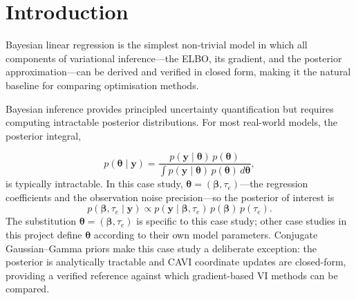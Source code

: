 \documentclass[11pt,a4paper]{article}
\begin{document}
\begin{abstract}
The comparison is not limited to ELBO convergence. The methods are also compared on runtime, iteration count, posterior mean accuracy, and posterior standard-deviation ratios against the analytical posterior and a Gibbs sampler reference. A secondary experiment adds entropy regularisation to the ELBO to test whether explicitly rewarding broader covariance estimates can reduce posterior variance collapse.

The central question is therefore not only which method maximises the ELBO. It is also whether the resulting approximation remains honest about uncertainty. This distinction is the main reason for using the linear model first: the posterior, CAVI baseline, and Gibbs reference can all be checked in the same setting before moving to less tractable models.
\end{abstract}

\newpage
\section{Introduction}

Bayesian linear regression is the simplest non-trivial model in which all components
of variational inference---the ELBO, its gradient, and the posterior approximation---can
be derived and verified in closed form, making it the natural baseline for comparing
optimisation methods.

Bayesian inference provides principled uncertainty quantification but requires computing intractable posterior distributions. For most real-world models, the posterior integral,

\begin{equation*}
    p(\bm{\theta} \mid \bm{y}) = \frac{p(\bm{y} \mid \bm{\theta})\,p(\bm{\theta})}{\displaystyle\int p(\bm{y} \mid \bm{\theta})\,p(\bm{\theta})\, d\bm{\theta}},
\end{equation*}
\noindent 
is typically intractable.
In this case study, $\bm{\theta} = (\bm{\beta}, \tau_e)$---the regression coefficients
and the observation noise precision---so the posterior of interest is
\begin{equation*}
    p(\bm{\beta}, \tau_e \mid \bm{y}) \propto p(\bm{y} \mid \bm{\beta}, \tau_e)\,p(\bm{\beta})\,p(\tau_e).
\end{equation*}
The substitution $\bm{\theta} = (\bm{\beta}, \tau_e)$ is specific to this case study;
other case studies in this project define $\bm{\theta}$ according to their own model parameters.
Conjugate Gaussian--Gamma priors make this case study a deliberate exception: the posterior
is analytically tractable and CAVI coordinate updates are closed-form, providing a verified
reference against which gradient-based VI methods can be compared.
\end{document}
